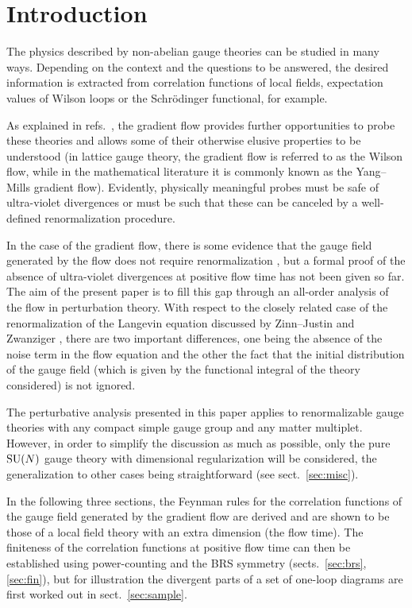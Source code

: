 \section{Introduction}\label{sec:intro}

The physics described by non-abelian gauge theories
can be studied in many ways. Depending on the
context and the questions to be answered,
the desired information is extracted from
correlation functions of local fields,
expectation values of Wilson loops or the Schr\"odinger
functional, for example.

As explained in refs.~\cite{WilsonFlow,Villasimius},
the gradient flow provides further opportunities
to probe these theories
and allows some of their otherwise elusive properties
to be understood
(in lattice gauge theory, the gradient flow is referred to
as the Wilson flow,
while in the mathematical literature it
is commonly known as the Yang--Mills gradient flow).
Evidently, physically meaningful probes must be safe of ultra-violet
divergences or must be such that these can be canceled by
a well-defined renormalization procedure.

In the case of the gradient flow,
there is some evidence that the gauge field generated by the
flow does not require renormalization \cite{WilsonFlow,Villasimius},
but a formal proof of the absence of ultra-violet divergences at
positive flow time has not been given so far.
The aim of the present paper is to fill this gap
through an all-order analysis of the flow in perturbation theory.
With respect to the closely related case of the renormalization of
the Langevin equation discussed by
Zinn--Justin and Zwanziger \cite{Zinn,ZinnZwanziger},
there are two important differences, one being the absence of
the noise term in the flow equation and the other the fact that
the initial distribution of the gauge field
(which is given by the functional integral of the theory considered)
is not ignored.

The perturbative analysis presented in this paper applies to
renormalizable gauge theories with any compact simple gauge group
and any matter multiplet.
However, in order to simplify the discussion as much as
possible, only the pure $\mathrm{SU}(N)$ gauge theory with dimensional
regularization will be considered, the generalization
to other cases being straightforward (see sect.~\ref{sec:misc}).

In the following three sections, the Feynman rules for the correlation
functions of the gauge
field generated by the gradient flow are derived and are
shown to be those of a local field theory with an extra dimension
(the flow time).
The finiteness of the correlation functions
at positive flow time can then be established
using power-counting and the BRS symmetry (sects.~\ref{sec:brs},\ref{sec:fin}),
but for illustration the divergent parts of a set of
one-loop diagrams are first worked out
in sect.~\ref{sec:sample}.

